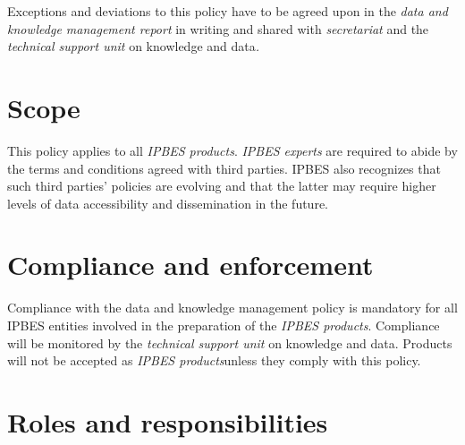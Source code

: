 \documentclass{article}
\begin{document}
Exceptions and deviations to this policy have to be agreed upon in the \textit{data and knowledge management report} in writing and shared with \textit{secretariat }and the \textit{technical support unit }on knowledge and data\textit{.}

\section*{Scope}

This policy applies to all \textit{IPBES products}. \textit{IPBES experts }are required to abide by the terms and conditions agreed with third parties. IPBES also recognizes that such third parties’ policies are evolving and that the latter may require higher levels of data accessibility and dissemination in the future.

\section*{Compliance and enforcement}

Compliance with the data and knowledge management policy is mandatory for all IPBES entities involved in the preparation of the \textit{IPBES products}. Compliance will be monitored by the \textit{technical support unit} on knowledge and data. Products will not be accepted as \textit{IPBES products}unless they comply with this policy.

\section*{Roles and responsibilities}
\end{document}
